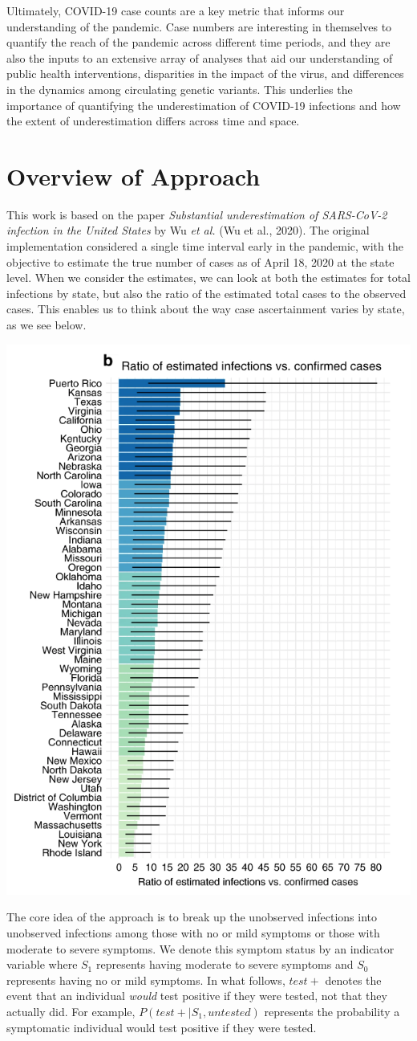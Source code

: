 \documentclass[12pt,twoside]{smiththesis}
\begin{document}
Ultimately, COVID-19 case counts are a key metric that informs our understanding of the pandemic. Case numbers are interesting in themselves to quantify the reach of the pandemic across different time periods, and they are also the inputs to an extensive array of analyses that aid our understanding of public health interventions, disparities in the impact of the virus, and differences in the dynamics among circulating genetic variants. This underlies the importance of quantifying the underestimation of COVID-19 infections and how the extent of underestimation differs across time and space.

\hypertarget{overview-of-approach}{%
\chapter{Overview of Approach}\label{overview-of-approach}}

This work is based on the paper \emph{Substantial underestimation of SARS-CoV-2 infection in the United States} by Wu \emph{et al.} (Wu et al., 2020). The original implementation considered a single time interval early in the pandemic, with the objective to estimate the true number of cases as of April 18, 2020 at the state level. When we consider the estimates, we can look at both the estimates for total infections by state, but also the ratio of the estimated total cases to the observed cases. This enables us to think about the way case ascertainment varies by state, as we see below.

\includegraphics[width=0.5\linewidth]{./figure/figure_original_case_ratio}

The core idea of the approach is to break up the unobserved infections into unobserved infections among those with no or mild symptoms or those with moderate to severe symptoms. We denote this symptom status by an indicator variable where \(S_1\) represents having moderate to severe symptoms and \(S_0\) represents having no or mild symptoms. In what follows, \(test +\) denotes the event that an individual \emph{would} test positive if they were tested, not that they actually did. For example, \(P(test+|S_1,untested)\) represents the probability a symptomatic individual would test positive if they were tested.
\end{document}
